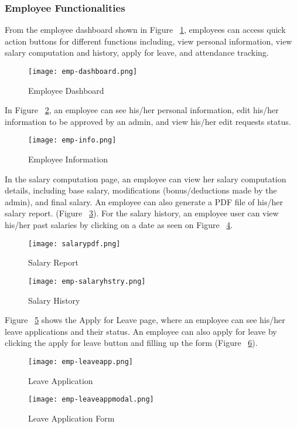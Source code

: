 \documentclass{icsthesis}
\begin{document}
\begin{mainmatter}
\subsubsection{Employee Functionalities} 

From the employee dashboard shown in Figure ~\ref{fig:emp-dash}, employees can access quick action buttons for different functions including, view personal information, view salary computation and history, apply for leave, and attendance tracking.

\begin{figure}[H]
    \centering
    \texttt{[image: emp-dashboard.png]}
    \caption{Employee Dashboard}
    \label{fig:emp-dash}
\end{figure}
In Figure ~\ref{fig:emp-userinfo}, an employee can see his/her personal information, edit his/her information to be approved by an admin, and view his/her edit requests status.
\begin{figure}[H]
    \centering
    \texttt{[image: emp-info.png]}
    \caption{Employee Information }
    \label{fig:emp-userinfo}
\end{figure}
In the salary computation page, an employee can view her salary computation details, including base salary, modifications (bonus/deductions made by the admin), and final salary. An employee can also generate a PDF file of his/her salary report. (Figure ~\ref{fig:salarypdf}). For the salary history, an employee user can view his/her past salaries by clicking on a date as seen on Figure ~\ref{fig:emp-salaryhistory}.
\begin{figure}[H]
    \centering
    \texttt{[image: salarypdf.png]}
    \caption{Salary Report}
    \label{fig:salarypdf}
\end{figure}
\begin{figure}[H]
    \centering
    \texttt{[image: emp-salaryhstry.png]}
    \caption{Salary History}
    \label{fig:emp-salaryhistory}
\end{figure}
Figure ~\ref{fig:emp-leaveapp} shows the Apply for Leave page, where an employee can see his/her leave applications and their status. An employee can also apply for leave by clicking the apply for leave button and filling up the form (Figure ~\ref{fig:emp-leavemodal}).

\begin{figure}[H]
    \centering
    \texttt{[image: emp-leaveapp.png]}
    \caption{Leave Application}
    \label{fig:emp-leaveapp}
\end{figure}
\begin{figure}[H]
    \centering
    \texttt{[image: emp-leaveappmodal.png]}
    \caption{Leave Application Form}
    \label{fig:emp-leavemodal}
\end{figure}


\end{mainmatter}
\end{document}
